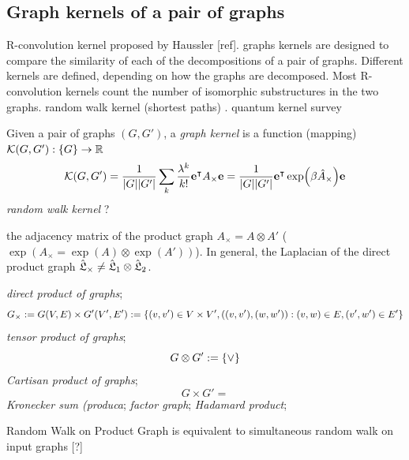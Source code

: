 \subsection{Graph kernels of a pair of graphs}
R-convolution kernel proposed by Haussler [ref].
graphs kernels are designed to compare the similarity of each of the decompositions of a pair of graphs.
Different kernels are defined, depending on how the graphs are decomposed.
Most R-convolution kernels count the number of isomorphic substructures in the two graphs.
random walk kernel (shortest paths)
\cite{vishwanathanGraphKernels2010}. 
quantum kernel
\cite{baiQuantumJensenShannon2015}
survey
\cite{kriegeSurveyGraphKernels2020}
\begin{definition}\label{def:graph_kernel}
	Given a pair of graphs $(G,G')$,
	a \emph{graph kernel} is a function (mapping)
	$\mathcal{K}(G,G'): \qty{ G} \to \mathbb{R}$
	\begin{equation}
		\mathcal{K}(G,G') =
		\frac{1}{\abs{G}\abs{G'}}
		\sum_k \frac{\lambda^k}{k!} \vb{e}^\intercal A_{\times} \vb{e}
		=\frac{1}{\abs{G}\abs{G'}}
		\vb{e}^\intercal \exp(\beta \hat{A}_{\times}) \vb{e}
	\end{equation}
	\emph{random walk kernel} ?
\end{definition}
\begin{fact}
	the adjacency matrix of the product graph $A_{\times}=A\otimes A'$ ($\exp(A_{\times}=\exp(A)\otimes \exp(A'))$).	
	In general, the Laplacian of the direct product graph 
	$\hat{\mathfrak{L}}_{\times}\neq \hat{\mathfrak{L}}_1\otimes \hat{\mathfrak{L}}_2$.
\end{fact}
\cite{chungSpectralGraphTheory1997}
\begin{definition}\label{def:product_graphs}
	\emph{direct product of graphs};
	\begin{equation}
		G_{\times} : =
		G(V,E)\times G'(V',E') 
		: = \qty{(v,v')\in V\times V',((v,v'),(w,w')): (v,w)\in E, (v',w')\in E'}
	\end{equation}
	\emph{tensor product of graphs};
	\begin{equation}
		G\otimes G' := \qty{ \vee }
	\end{equation}
	\emph{Cartisan product of graphs};
	\begin{equation}
		G\times G' = \qty{}
	\end{equation}
	\emph{Kronecker sum (produca};
	\emph{factor graph};
	\emph{Hadamard product};
\end{definition}
\begin{remark}
	Random Walk on Product Graph is equivalent to simultaneous random walk on input graphs [?]
\end{remark}

